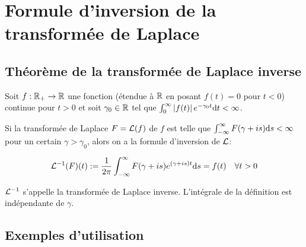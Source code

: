 \section{Formule d'inversion de la transformée de Laplace}

\subsection{Théorème de la transformée de Laplace inverse}

\begin{theorem}
    Soit $f: \mathbb{R}_+ \rightarrow \mathbb{R}$ une fonction (étendue à $\mathbb{R}$ en posant $f(t) = 0$ pour $t < 0$) continue pour $t > 0$ et soit $\gamma_0 \in \mathbb{R}$ tel que $\int_0^\infty \left|f(t)\right|e^{-\gamma_0 t}\mathrm{d}t < \infty$.
    
    Si la transformée de Laplace $F = \mathcal{L}(f)$ de $f$ est telle que $\int_{-\infty}^\infty F(\gamma + is) \mathrm{d}s < \infty$ pour un certain $\gamma > \gamma_0$, alors on a la formule d'inversion de $\mathcal{L}$:
    
    \[ \mathcal{L}^{-1}(F)(t) := \frac{1}{2\pi} \int_{-\infty}^\infty F(\gamma + is) e^{(\gamma + is) t} \mathrm{d}s = f(t) \quad \forall t > 0 \]
    
    $\mathcal{L}^{-1}$ s'appelle la transformée de Laplace inverse.
    L'intégrale de la définition est indépendante de $\gamma$.
\end{theorem}

\subsection{Exemples d'utilisation}

